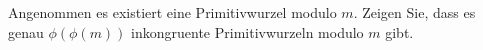 
\begin{exercise}

Angenommen es existiert eine Primitivwurzel modulo $m$.
Zeigen Sie, dass es genau $\phi(\phi(m))$ inkongruente Primitivwurzeln
modulo $m$ gibt.

\end{exercise}


\begin{solution}

\phantom{}

\end{solution}

